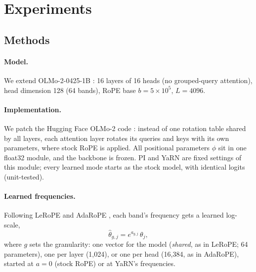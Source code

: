 \documentclass[11pt]{article}
\begin{document}
\section{Experiments}

\subsection{Methods}

\paragraph{Model.} We extend OLMo-2-0425-1B \citep{olmo2024olmo2}: 16 layers of 16 heads (no grouped-query attention), head dimension 128 (64 bands), RoPE base $b = 5\times10^5$, $L = 4096$.

\paragraph{Implementation.} We patch the Hugging Face OLMo-2 code \citep{wolf2020transformers}: instead of one rotation table shared by all layers, each attention layer rotates its queries and keys with its own parameters, where stock RoPE is applied. All positional parameters $\phi$ sit in one float32 module, and the backbone is frozen. PI and YaRN are fixed settings of this module; every learned mode starts as the stock model, with identical logits (unit-tested).



\paragraph{Learned frequencies.} Following LeRoPE \citep{karypis2026lerope} and AdaRoPE \citep{wang2026adarope}, each band's frequency gets a learned log-scale,
\begin{equation}
\hat\theta_{g,j} = e^{a_{g,j}}\,\theta_j,
\end{equation}
where $g$ sets the granularity: one vector for the model (\emph{shared}, as in LeRoPE; 64 parameters), one per layer (1{,}024), or one per head (16{,}384, as in AdaRoPE), started at $a = 0$ (stock RoPE) or at YaRN's frequencies.
\end{document}
